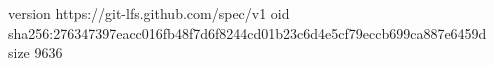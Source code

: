 version https://git-lfs.github.com/spec/v1
oid sha256:276347397eacc016fb48f7d6f8244cd01b23c6d4e5cf79eccb699ca887e6459d
size 9636
